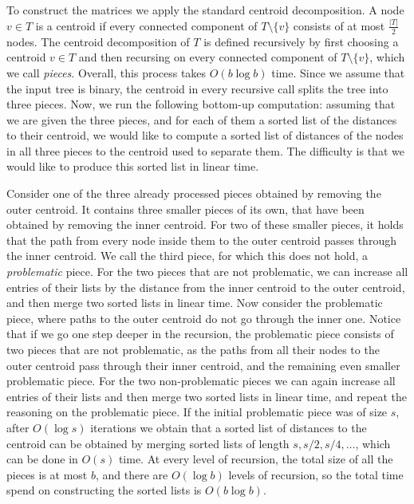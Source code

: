 \documentclass[a4paper,UKenglish]{lipics-v2016}
\theoremstyle{plain}
\begin{document}
To construct the matrices we apply the standard centroid decomposition. A node $v\in T$ is a centroid if every connected component of
$T\setminus\{v\}$ consists of at most $\frac{|T|}{2}$ nodes. The centroid decomposition of $T$ is defined recursively by first choosing a centroid
$v\in T$ and then recursing on every connected component of $T\setminus\{v\}$, which we call \emph{pieces}.
Overall, this process takes $O(b\log b)$ time. Since we assume that the input tree is binary, the centroid in every recursive call splits the tree
into three pieces. Now, we run the following bottom-up computation: assuming that we are given the three pieces, and for each of
them a sorted list of the distances to their centroid, we would like to compute a sorted list of distances of the nodes in all three pieces
to the centroid used to separate them. The difficulty is that we would like to produce this sorted list in linear time.

Consider one of the three already processed pieces obtained by removing the outer centroid. It contains three smaller pieces of its own,
that have been obtained by removing the inner centroid.
For two of these smaller pieces, it holds that the path from every node inside them to the outer centroid passes through the inner centroid.
We call the third piece, for which this does not hold, a \textit{problematic} piece. For the two pieces that are not problematic, we can 
increase all entries of their lists by the distance from the inner centroid to the outer centroid, and then merge two sorted lists in linear time.
Now consider the problematic piece, where paths to the outer centroid do not go through the inner one. Notice that if we go one step deeper
in the recursion, the problematic piece consists of two pieces that are not problematic, as the paths from all their nodes to the outer centroid
pass through their inner centroid, and the remaining even smaller problematic piece. For the two non-problematic pieces we can again
increase all entries of their lists and then merge two sorted lists in linear time, and repeat the reasoning on the problematic piece.
If the initial problematic piece was of size $s$, after $O(\log s)$ iterations we obtain that a sorted list of distances to the centroid can be
obtained by merging sorted lists of length $s,s/2,s/4,\ldots$, which can be done in $O(s)$ time. At every level of recursion, 
the total size of all the pieces is at most $b$, and there are $O(\log b)$ levels of recursion, so the total time spend on constructing
the sorted lists is $O(b\log b)$.
\end{document}

